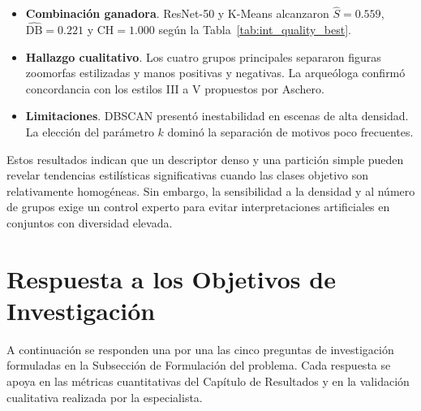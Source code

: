 \begin{itemize}
  \item \textbf{Combinación ganadora}.  ResNet-50 y K-Means alcanzaron
        \(\widehat{S}=0.559\), \(\widehat{\mathrm{DB}}=0.221\)
        y \(\widehat{\mathrm{CH}}=1.000\) según la Tabla~\ref{tab:int_quality_best}.
  \item \textbf{Hallazgo cualitativo}.  Los cuatro grupos principales
        separaron figuras zoomorfas estilizadas y manos positivas y negativas.
        La arqueóloga confirmó concordancia con los estilos III a V propuestos por Aschero.
  \item \textbf{Limitaciones}.  DBSCAN presentó inestabilidad en escenas de alta densidad.
        La elección del parámetro \(k\) dominó la separación de motivos poco frecuentes.
\end{itemize}

Estos resultados indican que un descriptor denso y una partición simple pueden revelar tendencias estilísticas significativas cuando las clases objetivo son relativamente homogéneas.
Sin embargo, la sensibilidad a la densidad y al número de grupos exige un control experto para evitar interpretaciones artificiales en conjuntos con diversidad elevada.

\section{Respuesta a los Objetivos de Investigación}

A continuación se responden una por una las cinco preguntas de investigación formuladas en la Subsección de Formulación del problema.
Cada respuesta se apoya en las métricas cuantitativas del Capítulo de Resultados y en la validación cualitativa realizada por la especialista.

